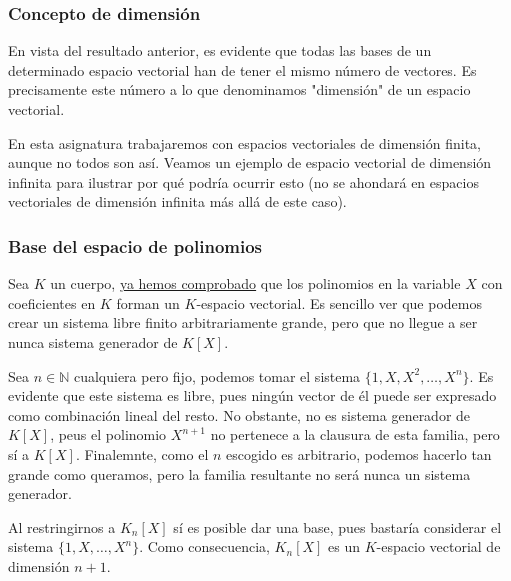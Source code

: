 \documentclass[12pt]{article}
\begin{document}
\subsubsection{Concepto de dimensión}
\hspace{3mm}
En vista del resultado anterior, es evidente que todas las bases de un determinado espacio vectorial han de tener el mismo
número de vectores. Es precisamente este número a lo que denominamos "dimensión" de un espacio vectorial.

\newpage
En esta asignatura trabajaremos con espacios vectoriales de dimensión finita, aunque no todos son así. Veamos un ejemplo de espacio
vectorial de dimensión infinita para ilustrar por qué podría ocurrir esto (no se ahondará en espacios vectoriales de dimensión infinita
más allá de este caso).

\subsubsection{Base del espacio de polinomios}
\hspace{3mm}
Sea $K$ un cuerpo, \hyperref[polinomios-espacio-vectorial]{ya hemos comprobado} que los
polinomios en la variable $X$ con coeficientes en $K$ forman un $K$-espacio vectorial. Es sencillo
ver que podemos crear un sistema libre finito arbitrariamente grande, pero que no llegue a ser nunca 
sistema generador de $K[X]$.

\vspace{2mm}
Sea $n \in \mathbb{N}$ cualquiera pero fijo, podemos tomar el sistema $\{1,X,X^2, \ldots, X^n\}$.
Es evidente que este sistema es libre, pues ningún vector de él puede ser expresado como combinación
lineal del resto. No obstante, no es sistema generador de $K[X]$, peus el polinomio $X^{n+1}$ no
pertenece a la clausura de esta familia, pero sí a $K[X]$. Finalemnte, como el $n$ escogido es arbitrario,
podemos hacerlo tan grande como queramos, pero la familia resultante no será nunca un sistema generador.

\vspace{2mm}
Al restringirnos a $K_n[X]$ sí es posible dar una base, pues bastaría considerar el sistema
$\{1,X,\ldots,X^n\}$. Como consecuencia, $K_n[X]$ es un $K$-espacio vectorial de dimensión $n+1$.
\end{document}
